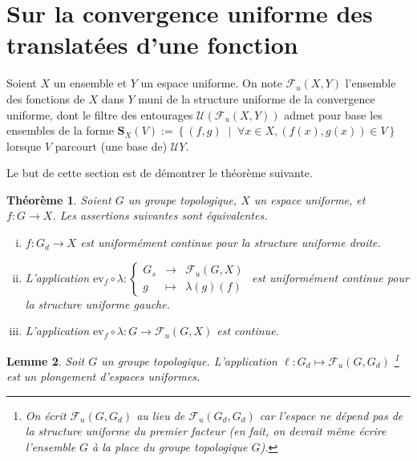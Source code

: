 \documentclass[a4paper,12pt]{article}
\newtheorem{theorem}{Théorème}[section]
\newtheorem{lemma}[theorem]{Lemme}
\newcommand{\R}{\mathbb{R}}
\newcommand{\ev}{\mathrm{ev}}
\newcommand{\set}[1]{\left\{ #1 \right\}}
\newcommand\fundef[3]{#1: \left\{\begin{array}{ccc}#2\\#3\end{array}\right.}
\newcommand{\tq}{\;\middle|\;}
\newcommand{\comp}{\circ}
\begin{document}
%

\section{Sur la convergence uniforme des translatées d'une fonction}

Soient $X$ un ensemble et $Y$ un espace uniforme. On note $\mathcal{F}_u(X, Y)$ l'ensemble des 
fonctions de $X$ dans $Y$ muni de la structure uniforme de la convergence uniforme, dont le filtre des entourages 
$\mathcal{U}(\mathcal{F}_u(X, Y))$ admet pour base les ensembles de la forme 
$\mathbf{S}_X(V) := \set{(f, g)\tq\forall x\in X, (f(x),g(x))\in V}$ lorsque $V$ parcourt (une base de) $\mathcal{U}Y$.

Le but de cette section est de démontrer le théorème suivante.
\begin{theorem}\label{uniform_continuous_iff_postcomp}
    Soient $G$ un groupe topologique, $X$ un espace uniforme, et $f:G\to X$. Les assertions suivantes sont équivalentes.
    \begin{enumerate}[(i)]
        \item $f:G_d\to X$ est uniformément continue \emph{pour la structure uniforme droite}.
        \item L'application $\fundef{\ev_f\comp\lambda}{G_s&\to&\mathcal{F}_u(G,X)}{g&\mapsto&\lambda(g)(f)}$ est uniformément continue
            \emph{pour la structure uniforme gauche}.
        \item L'application $\ev_f\comp\lambda:G\to\mathcal{F}_u(G,X)$ est continue.
    \end{enumerate}
\end{theorem}

\begin{lemma}
    Soit $G$ un groupe topologique. L'application $\ell : G_d\mapsto\mathcal{F}_u(G, G_d)$
    \footnote{On écrit $\mathcal{F}_u(G, G_d)$ au lieu de $\mathcal{F}_u(G_d, G_d)$ car l'espace
    ne dépend pas de la structure uniforme du premier facteur (en fait, on devrait même écrire l'ensemble $G$ 
    à la place du groupe topologique $G$).} est un plongement d'espaces uniformes.
\end{lemma}
\end{document}
